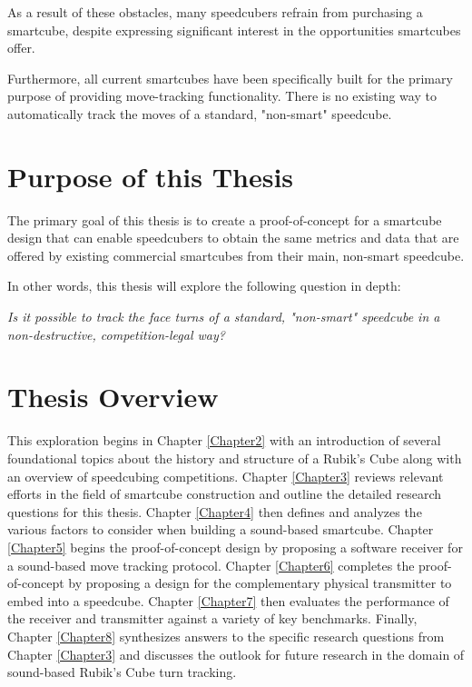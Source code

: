 As a result of these obstacles, many speedcubers refrain from
purchasing a smartcube, despite expressing significant interest in the
opportunities smartcubes offer.

Furthermore, all current smartcubes have been specifically built for
the primary purpose of providing move-tracking functionality. There is
no existing way to automatically track the moves of a standard,
"non-smart" speedcube.


\section{Purpose of this Thesis}
\label{sec:thesis-purpose}

The primary goal of this thesis is to create a proof-of-concept for a
smartcube design that can enable speedcubers to obtain the same
metrics and data that are offered by existing commercial smartcubes
from their main, non-smart speedcube.

In other words, this thesis will explore the following question in depth:

\emph{Is it possible to track the face turns of a standard, "non-smart"
speedcube in a non-destructive, competition-legal way?}


\section{Thesis Overview}
\label{sec:thesis-overview}

This exploration begins in Chapter \ref{Chapter2} with an introduction
of several foundational topics about the history and structure of a
Rubik's Cube along with an overview of speedcubing competitions.
Chapter \ref{Chapter3} reviews relevant efforts in the field of
smartcube construction and outline the detailed research questions for
this thesis. Chapter \ref{Chapter4} then defines and analyzes the
various factors to consider when building a sound-based smartcube.
Chapter \ref{Chapter5} begins the proof-of-concept design by proposing
a software receiver for a sound-based move tracking protocol. Chapter
\ref{Chapter6} completes the proof-of-concept by proposing a design for
the complementary physical transmitter to embed into a speedcube.
Chapter \ref{Chapter7} then evaluates the performance of the receiver
and transmitter against a variety of key benchmarks. Finally, Chapter
\ref{Chapter8} synthesizes answers to the specific research questions
from Chapter \ref{Chapter3} and discusses the outlook for future
research in the domain of sound-based Rubik's Cube turn tracking.
